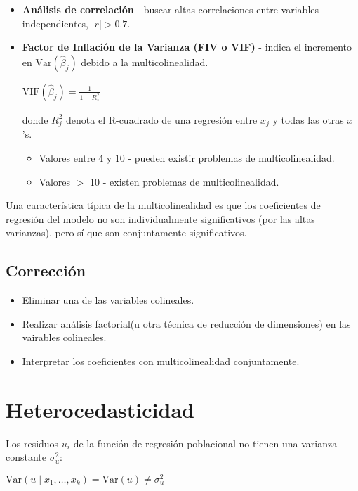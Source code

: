 \documentclass[10pt, a4paper, landscape]{extarticle}
\newcommand{\Var}{\mathrm{Var}}
\begin{document}
\begin{multicols}{3}
\begin{itemize}[leftmargin=*]
	\item \textbf{Análisis de correlación} - buscar altas correlaciones entre variables independientes, $\lvert r \rvert > 0.7$.
	\item \textbf{Factor de Inflación de la Varianza (FIV o VIF)} - indica el incremento en $\Var(\hat{\beta}_j)$ debido a la multicolinealidad.
	\begin{center}
			$\mathrm{VIF} (\hat{\beta}_j) = \frac{1}{1-R_j^2}$
	\end{center}
	donde $R^2_j$ denota el R-cuadrado de una regresión entre $x_j$ y todas las otras $x$'s. 
	\begin{itemize}[leftmargin=*]
		\item Valores entre 4 y 10 - pueden existir problemas de multicolinealidad.
		\item Valores $>$ 10 - existen problemas de multicolinealidad.
	\end{itemize}
\end{itemize}

Una característica típica de la multicolinealidad es que los coeficientes de regresión del modelo no son individualmente significativos (por las altas varianzas), pero sí que son conjuntamente significativos.

\subsection*{Corrección}

\begin{itemize}[leftmargin=*]
			\item Eliminar una de las variables colineales.
			\item Realizar análisis factorial(u otra técnica de reducción de dimensiones) en las vairables colineales.
			\item Interpretar los coeficientes con multicolinealidad conjuntamente.
\end{itemize}

\columnbreak

\section*{Heterocedasticidad}

Los residuos $u_i$ de la función de regresión poblacional no tienen una varianza constante $\sigma^2_u$:

\begin{center}
	$\Var(u \mid x_1, \ldots, x_k) = \Var(u) \neq \sigma^2_u$
\end{center}


\end{multicols}
\end{document}
